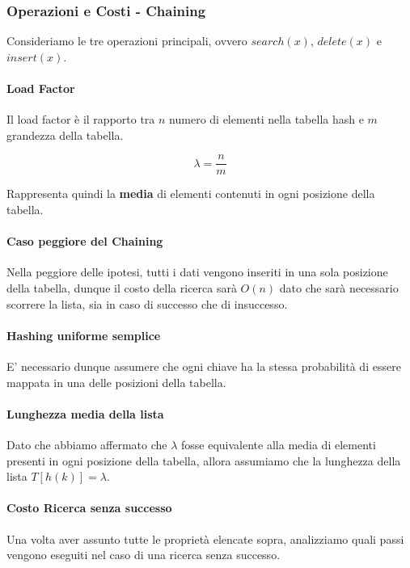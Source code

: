 \documentclass{article}
\begin{document}
\subsubsection{Operazioni e Costi - Chaining} Consideriamo le tre operazioni principali, ovvero $search(x)$, $delete(x)$ e $insert(x)$.

\paragraph{Load Factor} Il load factor è il rapporto tra $n$ numero di elementi nella tabella hash e $m$ grandezza della tabella.

\begin{equation}
    \lambda=\frac{n}{m}
\end{equation}

Rappresenta quindi la \textbf{media} di elementi contenuti in ogni posizione della tabella.

\paragraph{Caso peggiore del Chaining} Nella peggiore delle ipotesi, tutti i dati vengono inseriti in una sola posizione della tabella, dunque il costo della ricerca sarà $O(n)$ dato che sarà necessario scorrere la lista, sia in caso di successo che di insuccesso. 

\paragraph{Hashing uniforme semplice} E' necessario dunque assumere che ogni chiave ha la stessa probabilità di essere mappata in una delle posizioni della tabella.

\paragraph{Lunghezza media della lista} Dato che abbiamo affermato che $\lambda$ fosse equivalente alla media di elementi presenti in ogni posizione della tabella, allora assumiamo che la lunghezza della lista $T[h(k)] = \lambda$.

\paragraph{Costo Ricerca senza successo} Una volta aver assunto tutte le proprietà elencate sopra, analizziamo quali passi vengono eseguiti nel caso di una ricerca senza successo.
\end{document}
